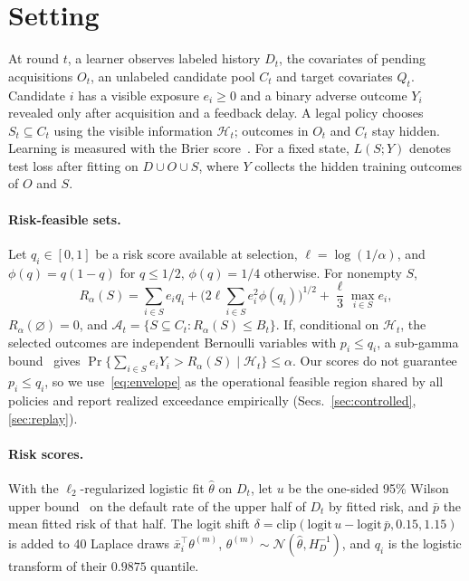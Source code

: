\documentclass[runningheads]{llncs}
\begin{document}
\section{Setting}
\label{sec:setting}
At round $t$, a learner observes labeled history $D_t$, the covariates of pending acquisitions $O_t$, an unlabeled candidate pool $C_t$ and target covariates $Q_t$. Candidate $i$ has a visible exposure $e_i\geq0$ and a binary adverse outcome $Y_i$ revealed only after acquisition and a feedback delay. A legal policy chooses $S_t\subseteq C_t$ using the visible information $\mathcal H_t$; outcomes in $O_t$ and $C_t$ stay hidden. Learning is measured with the Brier score~\cite{brier1950verification}. For a fixed state, $L(S;Y)$ denotes test loss after fitting on $D\cup O\cup S$, where $Y$ collects the hidden training outcomes of $O$ and $S$.

\paragraph{Risk-feasible sets.} Let $q_i\in[0,1]$ be a risk score available at selection, $\ell=\log(1/\alpha)$, and $\phi(q)=q(1-q)$ for $q\le1/2$, $\phi(q)=1/4$ otherwise. For nonempty $S$,
\begin{equation}
 R_\alpha(S)=\sum_{i\in S}e_iq_i+\Big(2\ell\sum_{i\in S}e_i^2\phi(q_i)\Big)^{1/2}+\frac{\ell}{3}\max_{i\in S}e_i,
 \label{eq:envelope}
\end{equation}
$R_\alpha(\varnothing)=0$, and $\mathcal A_t=\{S\subseteq C_t:R_\alpha(S)\le B_t\}$. If, conditional on $\mathcal H_t$, the selected outcomes are independent Bernoulli variables with $p_i\le q_i$, a sub-gamma bound~\cite{boucheron2013concentration} gives $\Pr\{\sum_{i\in S}e_iY_i>R_\alpha(S)\mid\mathcal H_t\}\le\alpha$. Our scores do not guarantee $p_i\le q_i$, so we use~\eqref{eq:envelope} as the operational feasible region shared by all policies and report realized exceedance empirically (Secs.~\ref{sec:controlled}, \ref{sec:replay}).

\paragraph{Risk scores.} With the $\ell_2$-regularized logistic fit $\widehat\theta$ on $D_t$, let $u$ be the one-sided 95\% Wilson upper bound~\cite{wilson1927probable} on the default rate of the upper half of $D_t$ by fitted risk, and $\bar p$ the mean fitted risk of that half. The logit shift $\delta=\mathrm{clip}(\mathrm{logit}\,u-\mathrm{logit}\,\bar p,0.15,1.15)$ is added to 40 Laplace draws $\bar x_i^\top\theta^{(m)}$, $\theta^{(m)}\sim\mathcal N(\widehat\theta,H_D^{-1})$, and $q_i$ is the logistic transform of their $0.9875$ quantile.
\end{document}
